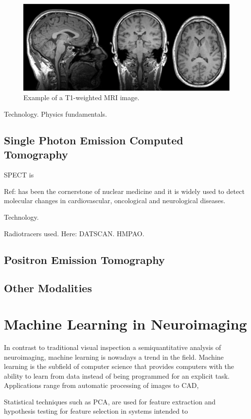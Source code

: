 \begin{figure}[htp]
\centering
\includegraphics[width=0.7\linewidth]{gfx/ch1/example_MRIT1}
\caption[Example of a T1-weighted MRI image.]{Example of a T1-weighted MRI image.}
\label{fig:example_MRI}
\end{figure}


Technology. Physics fundamentals. 

\subsection{Single Photon Emission Computed Tomography}
\acf{SPECT} is 

Ref: has been the cornerstone of nuclear medicine and it is widely used to detect molecular changes in cardiovascular, oncological and neurological diseases.

Technology. 

Radiotracers used. Here: DATSCAN. HMPAO. 

\subsection{Positron Emission Tomography}
\subsection{Other Modalities}

\section{Machine Learning in Neuroimaging}
In contrast to traditional visual inspection a semiquantitative analysis of neuroimaging, machine learning is nowadays a trend in the field. Machine learning is the subfield of computer science that provides computers with the ability to learn from data instead of being programmed for an explicit task. Applications range from automatic processing of images to \acf{CAD}, 

Statistical techniques such as \ac{PCA}, are used for feature extraction and hypothesis testing for feature selection in systems intended to 

